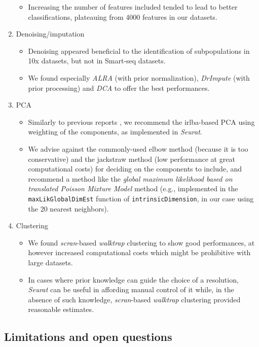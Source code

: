 \documentclass{bmcart}
\begin{document}
\begin{enumerate}
\begin{itemize}
     \item Increasing the number of features included tended to lead to better classifications, plateauing from 4000 features in our datasets.
   \end{itemize}
   \item Denoising/imputation
   \begin{itemize}
       \item Denoising appeared beneficial to the identification of subpopulations in 10x datasets, but not in Smart-seq datasets.
       \item We found especially \textit{ALRA} (with prior normalization), \textit{DrImpute} (with prior processing) and \textit{DCA} to offer the best performances.
   \end{itemize}
   \item PCA
   \begin{itemize}
     \item Similarly to previous reports \cite{SunDimRed2019}, we recommend the irlba-based PCA using weighting of the components, as implemented in \textit{Seurat}. 
     \item We advise against the commonly-used elbow method (because it is too conservative) and the jackstraw method (low performance at great computational costs) for deciding on the components to include, and recommend a method like the \textit{global maximum likelihood based on translated Poisson Mixture Model} method (e.g., implemented in the  \texttt{maxLikGlobalDimEst} function of \texttt{intrinsicDimension}, in our case using the 20 nearest neighbors).
   \end{itemize}
   \item Clustering
   \begin{itemize}
    \item We found \textit{scran}-based \textit{walktrap} clustering to show good performances, at however increased computational costs which might be prohibitive with large datasets.
    \item In cases where prior knowledge can guide the choice of a resolution, \textit{Seurat} can be useful in affording manual control of it while, in the absence of such knowledge, \textit{scran}-based \textit{walktrap} clustering provided reasonable estimates.
   \end{itemize}
\end{enumerate}

\subsection*{Limitations and open questions}
\end{document}
